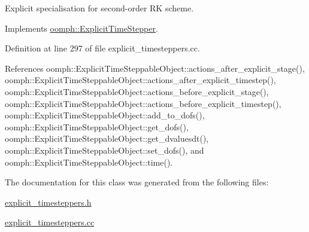 Explicit specialisation for second-\/order RK scheme. 



Implements \hyperlink{classoomph_1_1ExplicitTimeStepper_ab43bbab17960d0f50b8842e996f5c765}{oomph\+::\+Explicit\+Time\+Stepper}.



Definition at line 297 of file explicit\+\_\+timesteppers.\+cc.



References oomph\+::\+Explicit\+Time\+Steppable\+Object\+::actions\+\_\+after\+\_\+explicit\+\_\+stage(), oomph\+::\+Explicit\+Time\+Steppable\+Object\+::actions\+\_\+after\+\_\+explicit\+\_\+timestep(), oomph\+::\+Explicit\+Time\+Steppable\+Object\+::actions\+\_\+before\+\_\+explicit\+\_\+stage(), oomph\+::\+Explicit\+Time\+Steppable\+Object\+::actions\+\_\+before\+\_\+explicit\+\_\+timestep(), oomph\+::\+Explicit\+Time\+Steppable\+Object\+::add\+\_\+to\+\_\+dofs(), oomph\+::\+Explicit\+Time\+Steppable\+Object\+::get\+\_\+dofs(), oomph\+::\+Explicit\+Time\+Steppable\+Object\+::get\+\_\+dvaluesdt(), oomph\+::\+Explicit\+Time\+Steppable\+Object\+::set\+\_\+dofs(), and oomph\+::\+Explicit\+Time\+Steppable\+Object\+::time().



The documentation for this class was generated from the following files\+:\begin{DoxyCompactItemize}
\item 
\hyperlink{explicit__timesteppers_8h}{explicit\+\_\+timesteppers.\+h}\item 
\hyperlink{explicit__timesteppers_8cc}{explicit\+\_\+timesteppers.\+cc}\end{DoxyCompactItemize}
